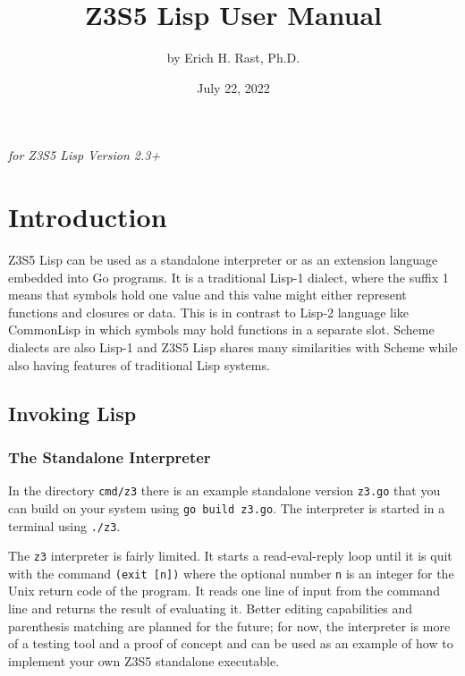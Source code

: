 \documentclass[
]{article}
\title{Z3S5 Lisp User Manual}
\author{by Erich H. Rast, Ph.D.}
\date{July 22, 2022}
\newcommand{\passthrough}[1]{#1}
\begin{document}
\maketitle

\emph{for Z3S5 Lisp Version 2.3+}

\hypertarget{introduction}{%
\section{Introduction}\label{introduction}}

Z3S5 Lisp can be used as a standalone interpreter or as an extension
language embedded into Go programs. It is a traditional Lisp-1 dialect,
where the suffix 1 means that symbols hold one value and this value
might either represent functions and closures or data. This is in
contrast to Lisp-2 language like CommonLisp in which symbols may hold
functions in a separate slot. Scheme dialects are also Lisp-1 and Z3S5
Lisp shares many similarities with Scheme while also having features of
traditional Lisp systems.

\hypertarget{invoking-lisp}{%
\subsection{Invoking Lisp}\label{invoking-lisp}}

\hypertarget{the-standalone-interpreter}{%
\subsubsection{The Standalone
Interpreter}\label{the-standalone-interpreter}}

In the directory \passthrough{\lstinline!cmd/z3!} there is an example
standalone version \passthrough{\lstinline!z3.go!} that you can build on
your system using \passthrough{\lstinline!go build z3.go!}. The
interpreter is started in a terminal using
\passthrough{\lstinline!./z3!}.

The \passthrough{\lstinline!z3!} interpreter is fairly limited. It
starts a read-eval-reply loop until it is quit with the command
\passthrough{\lstinline!(exit [n])!} where the optional number
\passthrough{\lstinline!n!} is an integer for the Unix return code of
the program. It reads one line of input from the command line and
returns the result of evaluating it. Better editing capabilities and
parenthesis matching are planned for the future; for now, the
interpreter is more of a testing tool and a proof of concept and can be
used as an example of how to implement your own Z3S5 standalone
executable.
\end{document}
